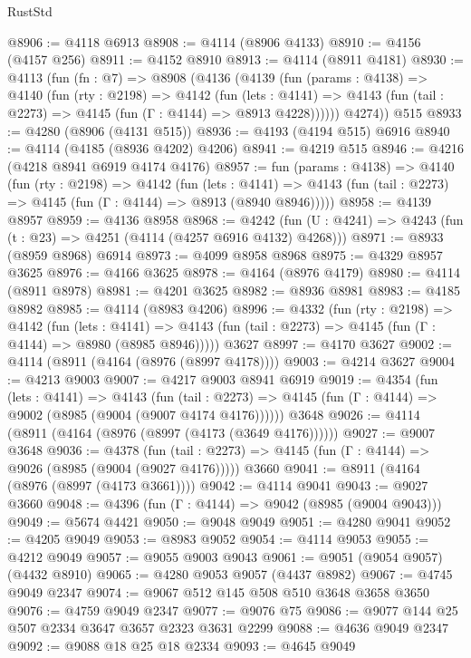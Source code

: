 \begin{lexlean}{RustStd}
\begin{coremodule}
@8906 := @4118 @6913
@8908 := @4114 (@8906 @4133)
@8910 := @4156 (@4157 @256)
@8911 := @4152 @8910
@8913 := @4114 (@8911 @4181)
@8930 := @4113
    (fun (fn : @7) =>
    @8908
      (@4136
        (@4139
          (fun (params : @4138) =>
          @4140
            (fun (rty : @2198) =>
            @4142
              (fun (lets : @4141) =>
              @4143 (fun (tail : @2273) => @4145 (fun (Γ : @4144) => @8913 @4228))))))
        @4274))
    @515
@8933 := @4280 (@8906 (@4131 @515))
@8936 := @4193 (@4194 @515) @6916
@8940 := @4114 (@4185 (@8936 @4202) @4206)
@8941 := @4219 @515
@8946 := @4216 (@4218 @8941 @6919 @4174 @4176)
@8957 := fun (params : @4138) =>
  @4140
    (fun (rty : @2198) =>
    @4142
      (fun (lets : @4141) =>
      @4143 (fun (tail : @2273) => @4145 (fun (Γ : @4144) => @8913 (@8940 @8946)))))
@8958 := @4139 @8957
@8959 := @4136 @8958
@8968 := @4242 (fun (U : @4241) => @4243 (fun (t : @23) => @4251 (@4114 (@4257 @6916 @4132) @4268)))
@8971 := @8933 (@8959 @8968) @6914
@8973 := @4099 @8958 @8968
@8975 := @4329 @8957 @3625
@8976 := @4166 @3625
@8978 := @4164 (@8976 @4179)
@8980 := @4114 (@8911 @8978)
@8981 := @4201 @3625
@8982 := @8936 @8981
@8983 := @4185 @8982
@8985 := @4114 (@8983 @4206)
@8996 := @4332
    (fun (rty : @2198) =>
    @4142
      (fun (lets : @4141) =>
      @4143 (fun (tail : @2273) => @4145 (fun (Γ : @4144) => @8980 (@8985 @8946)))))
    @3627
@8997 := @4170 @3627
@9002 := @4114 (@8911 (@4164 (@8976 (@8997 @4178))))
@9003 := @4214 @3627
@9004 := @4213 @9003
@9007 := @4217 @9003 @8941 @6919
@9019 := @4354
    (fun (lets : @4141) =>
    @4143
      (fun (tail : @2273) => @4145 (fun (Γ : @4144) => @9002 (@8985 (@9004 (@9007 @4174 @4176))))))
    @3648
@9026 := @4114 (@8911 (@4164 (@8976 (@8997 (@4173 (@3649 @4176))))))
@9027 := @9007 @3648
@9036 := @4378
    (fun (tail : @2273) => @4145 (fun (Γ : @4144) => @9026 (@8985 (@9004 (@9027 @4176)))))
    @3660
@9041 := @8911 (@4164 (@8976 (@8997 (@4173 @3661))))
@9042 := @4114 @9041
@9043 := @9027 @3660
@9048 := @4396 (fun (Γ : @4144) => @9042 (@8985 (@9004 @9043)))
@9049 := @5674 @4421
@9050 := @9048 @9049
@9051 := @4280 @9041
@9052 := @4205 @9049
@9053 := @8983 @9052
@9054 := @4114 @9053
@9055 := @4212 @9049
@9057 := @9055 @9003 @9043
@9061 := @9051 (@9054 @9057) (@4432 @8910)
@9065 := @4280 @9053 @9057 (@4437 @8982)
@9067 := @4745 @9049 @2347
@9074 := @9067 @512 @145 @508 @510 @3648 @3658 @3650
@9076 := @4759 @9049 @2347
@9077 := @9076 @75
@9086 := @9077 @144 @25 @507 @2334 @3647 @3657 @2323 @3631 @2299
@9088 := @4636 @9049 @2347
@9092 := @9088 @18 @25 @18 @2334
@9093 := @4645 @9049

\end{coremodule}
\end{lexlean}
